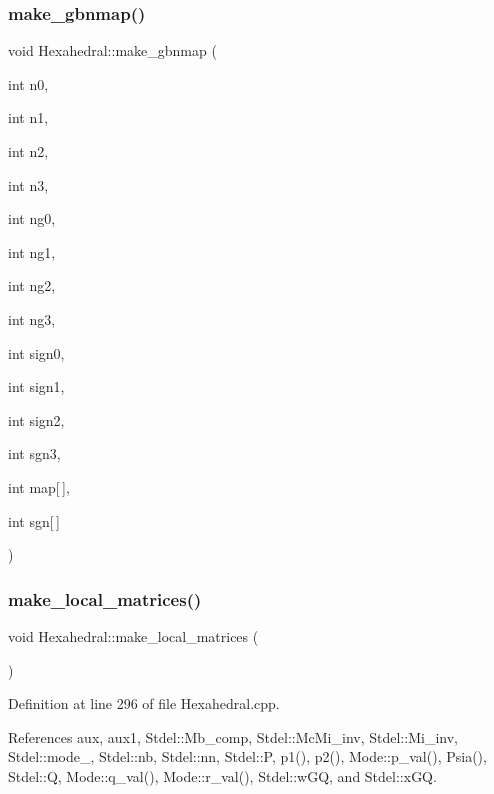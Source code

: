 \subsubsection{\texorpdfstring{make\+\_\+gbnmap()}{make\_gbnmap()}}
{\footnotesize\ttfamily void Hexahedral\+::make\+\_\+gbnmap (\begin{DoxyParamCaption}\item[{int}]{n0,  }\item[{int}]{n1,  }\item[{int}]{n2,  }\item[{int}]{n3,  }\item[{int}]{ng0,  }\item[{int}]{ng1,  }\item[{int}]{ng2,  }\item[{int}]{ng3,  }\item[{int}]{sign0,  }\item[{int}]{sign1,  }\item[{int}]{sign2,  }\item[{int}]{sgn3,  }\item[{int}]{map\mbox{[}$\,$\mbox{]},  }\item[{int}]{sgn\mbox{[}$\,$\mbox{]} }\end{DoxyParamCaption})}

\mbox{\label{classHexahedral_a0090804316dd33890d611b294cc2df91}} 
\subsubsection{\texorpdfstring{make\+\_\+local\+\_\+matrices()}{make\_local\_matrices()}}
{\footnotesize\ttfamily void Hexahedral\+::make\+\_\+local\+\_\+matrices (\begin{DoxyParamCaption}{ }\end{DoxyParamCaption})}



Definition at line 296 of file Hexahedral.\+cpp.



References aux, aux1, Stdel\+::\+Mb\+\_\+comp, Stdel\+::\+Mc\+Mi\+\_\+inv, Stdel\+::\+Mi\+\_\+inv, Stdel\+::mode\+\_\+, Stdel\+::nb, Stdel\+::nn, Stdel\+::P, p1(), p2(), Mode\+::p\+\_\+val(), Psia(), Stdel\+::Q, Mode\+::q\+\_\+val(), Mode\+::r\+\_\+val(), Stdel\+::w\+GQ, and Stdel\+::x\+GQ.

